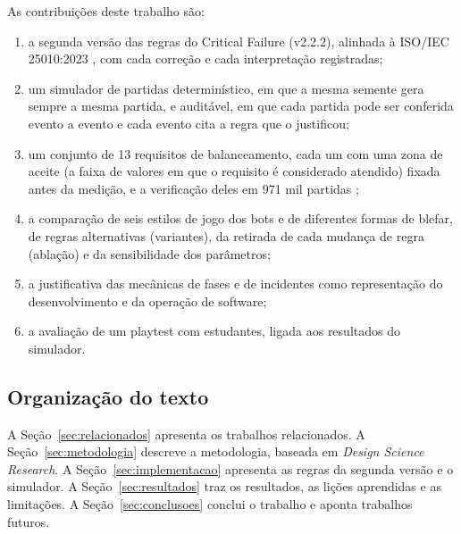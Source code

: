 As contribuições deste trabalho são:
\begin{enumerate}
  \item a segunda versão das regras do Critical Failure (v2.2.2), alinhada à ISO/IEC 25010:2023
    \cite{iso25010}, com cada correção e cada interpretação registradas;
  \item um simulador de partidas determinístico, em que a mesma semente gera sempre a mesma partida, e
    auditável, em que cada partida pode ser conferida evento a evento e cada evento cita a regra que o
    justificou;
  \item um conjunto de 13 requisitos de balanceamento, cada um com uma zona de aceite (a faixa de valores em que
    o requisito é considerado atendido) fixada antes da medição, e a verificação deles em 971 mil partidas
    ;
  \item a comparação de seis estilos de jogo dos bots e de diferentes formas de blefar, de regras alternativas
    (variantes), da retirada de cada mudança de regra (ablação) e da sensibilidade dos parâmetros;
  \item a justificativa das mecânicas de fases e de incidentes como representação do desenvolvimento e da
    operação de software;
  \item a avaliação de um playtest com estudantes, ligada aos resultados do simulador.
\end{enumerate}

\subsection{Organização do texto}

A Seção~\ref{sec:relacionados} apresenta os trabalhos relacionados. A Seção~\ref{sec:metodologia} descreve a
metodologia, baseada em \emph{Design Science Research}. A Seção~\ref{sec:implementacao} apresenta as regras da
segunda versão e o simulador. A Seção~\ref{sec:resultados} traz os resultados, as lições aprendidas e as
limitações. A Seção~\ref{sec:conclusoes} conclui o trabalho e aponta trabalhos futuros.
